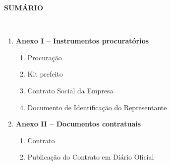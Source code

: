 \documentclass[
]{article}
\author{}
\date{}
\begin{document}
\textbf{SUMÁRIO}\\
\strut \\
\begin{enumerate}
  \item \textbf{Anexo I -- Instrumentos procuratórios }
  \begin{enumerate}
    \item Procuração 
    \item Kit prefeito 
    \item Contrato Social da Empresa 
    \item Documento de Identificação do Representante 
  \end{enumerate}

  \item \textbf{Anexo II -- Documentos contratuais }
  \begin{enumerate}
    \item Contrato 
    \item Publicação do Contrato em Diário Oficial 
  \end{enumerate}



\end{enumerate}
\end{document}
